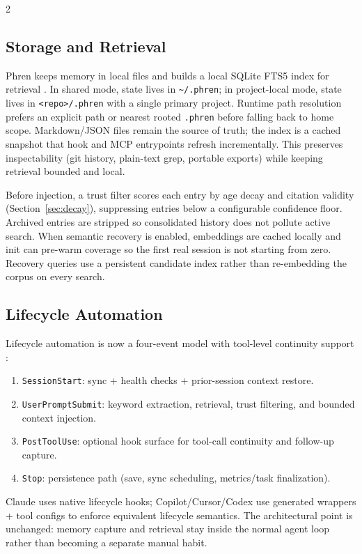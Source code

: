 \documentclass[10pt]{article}
\begin{document}
\vspace{0.2em}
\begin{multicols}{2}

\subsection{Storage and Retrieval}
Phren keeps memory in local files and builds a local SQLite FTS5 index for retrieval \cite{phren-readme,phren-shared,phren-cli}. In shared mode, state lives in \texttt{\textasciitilde/.phren}; in project-local mode, state lives in \texttt{<repo>/.phren} with a single primary project. Runtime path resolution prefers an explicit path or nearest rooted \texttt{.phren} before falling back to home scope. Markdown/JSON files remain the source of truth; the index is a cached snapshot that hook and MCP entrypoints refresh incrementally. This preserves inspectability (git history, plain-text grep, portable exports) while keeping retrieval bounded and local.

Before injection, a trust filter scores each entry by age decay and citation validity (Section~\ref{sec:decay}), suppressing entries below a configurable confidence floor. Archived entries are stripped so consolidated history does not pollute active search. When semantic recovery is enabled, embeddings are cached locally and init can pre-warm coverage so the first real session is not starting from zero. Recovery queries use a persistent candidate index rather than re-embedding the corpus on every search.

\subsection{Lifecycle Automation}
Lifecycle automation is now a four-event model with tool-level continuity support \cite{phren-cli,phren-hooks}:
\begin{enumerate}
  \item \texttt{SessionStart}: sync + health checks + prior-session context restore.
  \item \texttt{UserPromptSubmit}: keyword extraction, retrieval, trust filtering, and bounded context injection.
  \item \texttt{PostToolUse}: optional hook surface for tool-call continuity and follow-up capture.
  \item \texttt{Stop}: persistence path (save, sync scheduling, metrics/task finalization).
\end{enumerate}
Claude uses native lifecycle hooks; Copilot/Cursor/Codex use generated wrappers + tool configs to enforce equivalent lifecycle semantics. The architectural point is unchanged: memory capture and retrieval stay inside the normal agent loop rather than becoming a separate manual habit.


\end{multicols}
\end{document}
